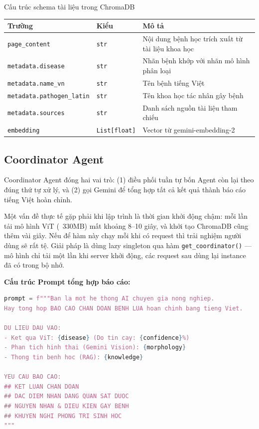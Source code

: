 \begin{table}[H]{Cấu trúc schema tài liệu trong ChromaDB}
\centering
\begin{tabular}{lll}
\toprule
\textbf{Trường} & \textbf{Kiểu} & \textbf{Mô tả} \\
\midrule
\texttt{page\_content} & \texttt{str} & Nội dung bệnh học trích xuất từ tài liệu khoa học \\
\texttt{metadata.disease} & \texttt{str} & Nhãn bệnh khớp với nhãn mô hình phân loại \\
\texttt{metadata.name\_vn} & \texttt{str} & Tên bệnh tiếng Việt \\
\texttt{metadata.pathogen\_latin} & \texttt{str} & Tên khoa học tác nhân gây bệnh \\
\texttt{metadata.sources} & \texttt{str} & Danh sách nguồn tài liệu tham chiếu \\
\texttt{embedding} & \texttt{List[float]} & Vector từ gemini-embedding-2 \\
\bottomrule
\end{tabular}
\end{table}

\subsection{Coordinator Agent}
Coordinator Agent đóng hai vai trò: (1) điều phối tuần tự bốn Agent còn lại theo đúng thứ tự xử lý, và (2) gọi Gemini để tổng hợp tất cả kết quả thành báo cáo tiếng Việt hoàn chỉnh.

Một vấn đề thực tế gặp phải khi lập trình là thời gian khởi động chậm: mỗi lần tải mô hình ViT (~330MB) mất khoảng 8--10 giây, và khởi tạo ChromaDB cũng thêm vài giây. Nếu để hàm này chạy mỗi khi có request thì trải nghiệm người dùng sẽ rất tệ. Giải pháp là dùng lazy singleton qua hàm \texttt{get\_coordinator()} --- mô hình chỉ tải một lần khi server khởi động, các request sau dùng lại instance đã có trong bộ nhớ.

\textbf{Cấu trúc Prompt tổng hợp báo cáo:}
\begin{lstlisting}[language=Python, caption={Prompt tổng hợp báo cáo trong Coordinator Agent}, label={lst:coordinator_prompt}]
prompt = f"""Ban la mot he thong AI chuyen gia nong nghiep.
Hay tong hop BAO CAO CHAN DOAN BENH LUA hoan chinh bang tieng Viet.

DU LIEU DAU VAO:
- Ket qua ViT: {disease} (Do tin cay: {confidence}%)
- Phan tich hinh thai (Gemini Vision): {morphology}
- Thong tin benh hoc (RAG): {knowledge}

YEU CAU BAO CAO:
## KET LUAN CHAN DOAN
## DAC DIEM NHAN DANG QUAN SAT DUOC
## NGUYEN NHAN & DIEU KIEN GAY BENH
## KHUYEN NGHI PHONG TRI SINH HOC
"""
\end{lstlisting}
\newpage

